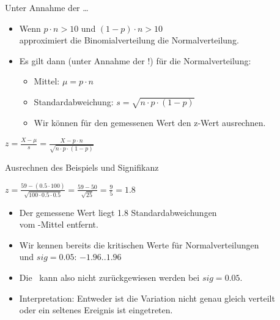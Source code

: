 \begin{frame}
  {Unter Annahme der \Null\ldots}
  \begin{itemize}[<+->]
    \item Wenn \alert{$p\cdot n>10$ und $(1-p)\cdot n>10$}\\
      approximiert die Binomialverteilung die Normalverteilung.
    \item Es gilt dann (unter Annahme der \Null!) für die Normalverteilung:
      \begin{itemize}
	\item Mittel: \alert{$\mu=p\cdot n$}
	\item Standardabweichung: \alert{$s=\sqrt{n\cdot p\cdot(1-p)}$}
	\item Wir können für den gemessenen Wert den z-Wert ausrechnen.
      \end{itemize}
  \end{itemize}
  \pause
  \vspace{0.5cm}
  \begin{center}
    \alert{$z=\frac{X-\mu}{s}=\frac{X-p\cdot n}{\sqrt{n\cdot p\cdot (1-p)}}$}
  \end{center}
\end{frame}

\begin{frame}
  {Ausrechnen des Beispiels und Signifikanz}
  \begin{center}
    $z=\frac{59-(0.5\cdot 100)}{\sqrt{100\cdot 0.5\cdot 0.5}}=\frac{59-50}{\sqrt{25}}=\frac{9}{5}=1.8$
  \end{center}
  \pause
  \begin{itemize}[<+->]
    \item Der gemessene Wert liegt 1.8 Standardabweichungen\\
      vom \Null-Mittel entfernt.
    \item Wir kennen bereits die kritischen Werte für Normalverteilungen\\
      und $sig=0.05$: \alert{$-1.96 .. 1.96$}
    \item Die \Null\ kann also nicht zurückgewiesen werden bei $sig=0.05$.
      \vspace{\baselineskip}
    \item Interpretation: Entweder ist die Variation nicht genau gleich verteilt\\
      \alert{oder ein seltenes Ereignis ist eingetreten.}
  \end{itemize}
\end{frame}

